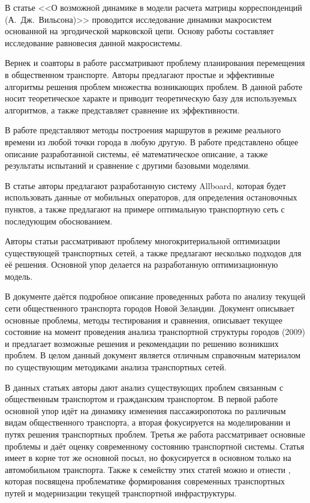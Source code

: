 В статье <<О возможной динамике в модели расчета матрицы корреспонденций (А.~Дж.~Вильсона)>>\cite{bib:24} 
проводится исследование динамики макросистем основанной на эргодической марковской цепи. Основу работы 
составляет исследование равновесия данной макросистемы.

Вернек и соавторы в работе \cite{bib:25} рассматривают проблему планирования перемещения в общественном 
транспорте. Авторы предлагают простые и эффективные алгоритмы решения проблем множества возникающих проблем.
В данной работе носит теоретическое характе и приводит теоретическую базу для используемых алгоритмов, а 
также представляет сравнение их эффективности.

В работе \cite{bib:27} представляют методы построения маршрутов в режиме реального времени из любой точки 
города в любую другую. В работе представлено общее описание разработанной системы, её математическое 
описание, а также результаты испытаний и сравнение с другими базовыми моделями.

В статье \cite{bib:28} авторы предлагают разработанную систему Allboard, которая будет использовать данные 
от мобильных операторов, для определения остановочных пунктов, а также предлагают на примере оптимальную 
транспортную сеть с последующим обоснованием. 

Авторы статьи \cite{bib:29} рассматривают проблему многокритериальной оптимизации существующей транспортных 
сетей, а также предлагают несколько подходов для её решения. Основной упор делается на разработанную 
оптимизационную модель.

В документе \cite{bib:30} даётся подробное описание проведенных работа по анализу текущей сети общественного 
транспорта городов Новой Зеландии. Документ описывает основные проблемы, методы тестирования и сравнения, 
описывает текущее состояние на момент проведения анализа транспортной структуры городов (2009) и предлагает 
возможные решения и рекомендации по решению возникших проблем. В целом данный документ является отличным 
справочным материалом по существующим методиками анализа транспортных сетей.

В данных статьях \cite{bib:31,bib:32,bib:34} авторы дают анализ существующих проблем связанным с 
общественным транспортом и гражданским транспортом. В первой работе основной упор идёт на динамику изменения 
пассажиропотока по различным видам общественного транспорта, а вторая фокусируется на моделировании и 
путях решения транспортных проблем. Третья же работа рассматривает основные проблемы и даёт оценку 
современному состоянию транспортной системы. Статья \cite{bib:39} имеет в корне тот же основной 
посыл, но фокусируется в основном только на автомобильном транспорта. Также к семейству этих статей можно и 
отнести \cite{bib:40}, которая посвящена проблематике формирования современных транспортных путей и 
модернизации текущей транспортной инфраструктуры.

